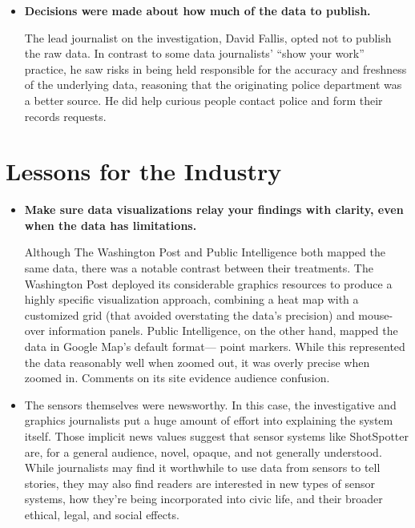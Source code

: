 \begin{itemize}
\item \textbf{Decisions were made about how much of the data to publish.}

The lead journalist on the investigation, David Fallis, opted not to
publish the raw data. In contrast to some data journalists' ``show your
work'' practice, he saw risks in being held responsible for the accuracy
and freshness of the underlying data, reasoning that the originating
police department was a better source. He did help curious people
contact police and form their records requests.
\end{itemize}

\section{Lessons for the Industry}
\begin{itemize}
\item \textbf{Make sure data visualizations relay your findings with clarity,
even when the data has limitations.}

Although The Washington Post and Public Intelligence both mapped
the same data, there was a notable contrast between their treatments.
The Washington Post deployed its considerable graphics resources to
produce a highly specific visualization approach, combining a heat
map with a customized grid (that avoided overstating the data's precision)
and mouse-over information panels. Public Intelligence, on
the other hand, mapped the data in Google Map's default format—
point markers. While this represented the data reasonably well when
zoomed out, it was overly precise when zoomed in. Comments on its
site evidence audience confusion.
\item The sensors themselves were newsworthy.
In this case, the investigative and graphics journalists put a huge
amount of effort into explaining the system itself. Those implicit news
values suggest that sensor systems like ShotSpotter are, for a general
audience, novel, opaque, and not generally understood. While journalists
may find it worthwhile to use data from sensors to tell stories,
they may also find readers are interested in new types of sensor systems,
how they're being incorporated into civic life, and their broader
ethical, legal, and social effects.
\end{itemize}

